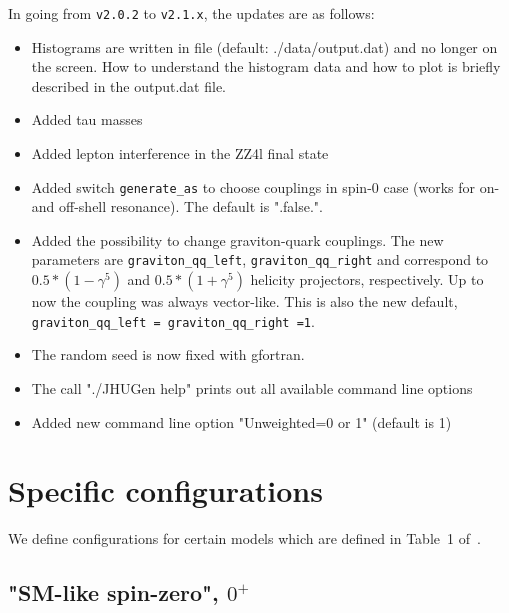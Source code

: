 \documentclass[aps,superscriptaddress,nofootinbib]{revtex4}
\begin{document}
\noindent
In going from \verb|v2.0.2| to \verb|v2.1.x|, the updates are as follows:

\begin{itemize}
\item Histograms are written in file (default: ./data/output.dat) and no longer on the screen.  How to understand the histogram data and how to plot is briefly described in the output.dat file.
\item Added tau masses
\item Added lepton interference in the ZZ4l final state
\item Added switch \verb|generate_as| to choose couplings in spin-0 case (works for on- and off-shell resonance). The default is ".false.".
\item Added the possibility to change graviton-quark couplings. The new parameters are \verb|graviton_qq_left|, \verb|graviton_qq_right| and correspond to $0.5*(1-\gamma^5)$ and $0.5*(1+\gamma^5)$ helicity projectors, respectively. Up to now the coupling was always vector-like. This is also the new default, \verb|graviton_qq_left = graviton_qq_right =1|.
\item The random seed is now fixed with gfortran.
\item The call "./JHUGen help" prints out all available command line options
\item Added new command line option "Unweighted=0 or 1" (default is 1)
\end{itemize}

\clearpage
\appendix


\section{Specific configurations}

We define configurations for certain models which are defined in Table~1 of~\cite{Bolognesi:2012}.

\subsection{"SM-like spin-zero", $0^+$}
\end{document}
